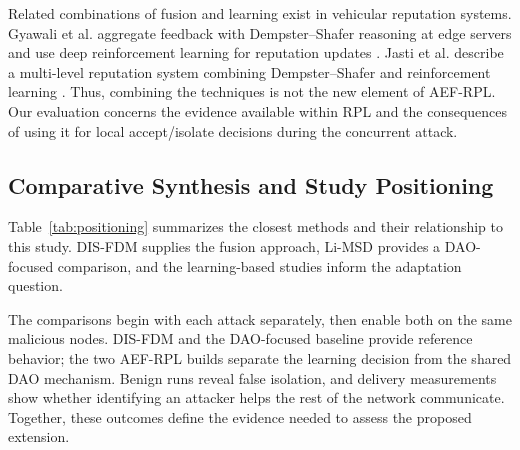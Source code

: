 \documentclass[journal]{IEEEtran}
\begin{document}
Related combinations of fusion and learning exist in vehicular reputation systems. Gyawali et al. aggregate feedback with Dempster--Shafer reasoning at edge servers and use deep reinforcement learning for reputation updates \cite{gyawali2021}. Jasti et al. describe a multi-level reputation system combining Dempster--Shafer and reinforcement learning \cite{jasti2024}. Thus, combining the techniques is not the new element of AEF-RPL. Our evaluation concerns the evidence available within RPL and the consequences of using it for local accept/isolate decisions during the concurrent attack.

\subsection{Comparative Synthesis and Study Positioning}
Table~\ref{tab:positioning} summarizes the closest methods and their relationship to this study. DIS-FDM supplies the fusion approach, Li-MSD provides a DAO-focused comparison, and the learning-based studies inform the adaptation question.

The comparisons begin with each attack separately, then enable both on the same malicious nodes. DIS-FDM and the DAO-focused baseline provide reference behavior; the two AEF-RPL builds separate the learning decision from the shared DAO mechanism. Benign runs reveal false isolation, and delivery measurements show whether identifying an attacker helps the rest of the network communicate. Together, these outcomes define the evidence needed to assess the proposed extension.
\end{document}
